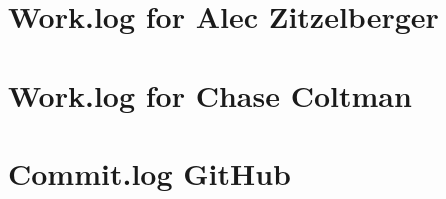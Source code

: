 \documentclass[journal,10pt,onecolumn,compsoc]{IEEEtran} \usepackage[margin=1.0in]{geometry} \usepackage{pdfpages}
\begin{document}
\section {Work.log for Alec Zitzelberger}

\section{Work.log for Chase Coltman}

\section{Commit.log GitHub}
 
\end{document}
